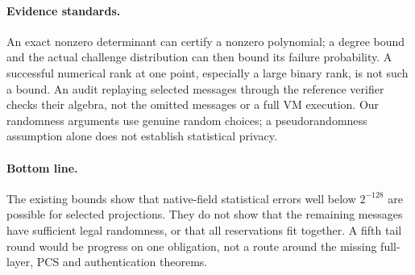 \paragraph{Evidence standards.} An exact nonzero determinant can certify a nonzero polynomial; a degree bound and the actual challenge distribution can then bound its failure probability. A successful numerical rank at one point, especially a large binary rank, is not such a bound. An audit replaying selected messages through the reference verifier checks their algebra, not the omitted messages or a full VM execution. Our randomness arguments use genuine random choices; a pseudorandomness assumption alone does not establish statistical privacy.


\paragraph{Bottom line.} The existing bounds show that native-field statistical errors well below $2^{-128}$ are possible for selected projections. They do not show that the remaining messages have sufficient legal randomness, or that all reservations fit together. A fifth tail round would be progress on one obligation, not a route around the missing full-layer, PCS and authentication theorems.
